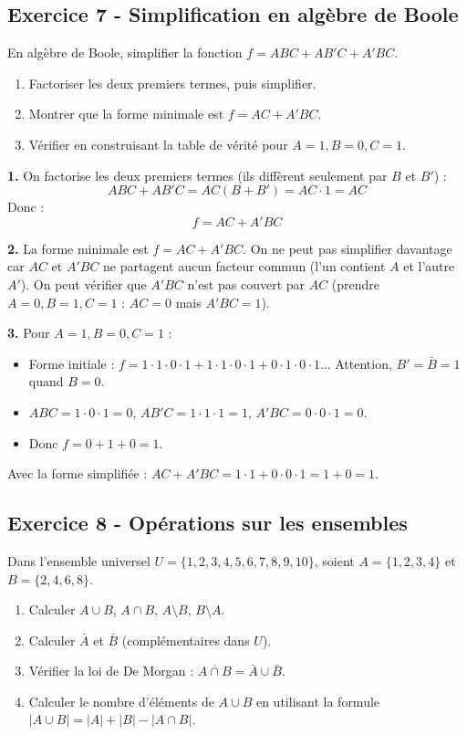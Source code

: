 \documentclass[12pt,a4paper]{article}
\begin{document}
\subsection*{Exercice 7 - Simplification en algèbre de Boole \niveau{\moyen}}

\begin{boiteexercice}
En algèbre de Boole, simplifier la fonction $f = ABC + AB'C + A'BC$.
\begin{enumerate}
  \item Factoriser les deux premiers termes, puis simplifier.
  \item Montrer que la forme minimale est $f = AC + A'BC$.
  \item Vérifier en construisant la table de vérité pour $A=1, B=0, C=1$.
\end{enumerate}
\end{boiteexercice}

\begin{boitecorrige}
\textbf{1.} On factorise les deux premiers termes (ils diffèrent seulement par $B$ et $B'$) :
\[
ABC + AB'C = AC(B + B') = AC\cdot 1 = AC
\]
Donc :
\[
f = AC + A'BC
\]

\textbf{2.} La forme minimale est $f = AC + A'BC$. On ne peut pas simplifier davantage car $AC$ et $A'BC$ ne partagent aucun facteur commun (l'un contient $A$ et l'autre $A'$). On peut vérifier que $A'BC$ n'est pas couvert par $AC$ (prendre $A=0, B=1, C=1$ : $AC=0$ mais $A'BC=1$).

\textbf{3.} Pour $A=1, B=0, C=1$ :
\begin{itemize}
  \item Forme initiale : $f = 1\cdot1\cdot0\cdot1 + 1\cdot1\cdot0\cdot1 + 0\cdot1\cdot0\cdot1$... Attention, $B'=\bar{B}=1$ quand $B=0$.
  \item $ABC = 1\cdot0\cdot1 = 0$, $AB'C = 1\cdot1\cdot1 = 1$, $A'BC = 0\cdot0\cdot1 = 0$.
  \item Donc $f = 0 + 1 + 0 = 1$.
\end{itemize}
Avec la forme simplifiée : $AC + A'BC = 1\cdot1 + 0\cdot0\cdot1 = 1 + 0 = 1$.
\end{boitecorrige}

\subsection*{Exercice 8 - Opérations sur les ensembles \niveau{\facile}}

\begin{boiteexercice}
Dans l'ensemble universel $U = \{1, 2, 3, 4, 5, 6, 7, 8, 9, 10\}$, soient $A = \{1,2,3,4\}$ et $B = \{2,4,6,8\}$.
\begin{enumerate}
  \item Calculer $A\cup B$, $A\cap B$, $A\setminus B$, $B\setminus A$.
  \item Calculer $\bar{A}$ et $\bar{B}$ (complémentaires dans $U$).
  \item Vérifier la loi de De Morgan : $\overline{A\cap B} = \bar{A}\cup\bar{B}$.
  \item Calculer le nombre d'éléments de $A\cup B$ en utilisant la formule $|A\cup B| = |A| + |B| - |A\cap B|$.
\end{enumerate}
\end{boiteexercice}
\end{document}
